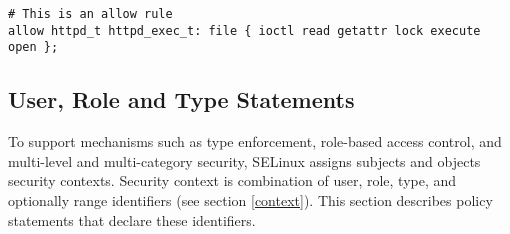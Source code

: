 \begin{lstlisting}[language=te]
# This is an allow rule
allow httpd_t httpd_exec_t: file { ioctl read getattr lock execute open };
\end{lstlisting}


\subsection{User, Role and Type Statements}
\label{userroletype}
To support mechanisms such as type enforcement, role-based access control, and
multi-level and multi-category security, SELinux assigns subjects and objects
security contexts. Security context is combination of user, role, type, and
optionally range identifiers (see section \ref{context}). This section describes
policy statements that declare these identifiers.

